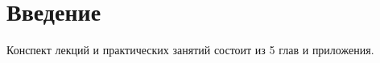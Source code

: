 \chapter*{Введение}
\chaptermark{}
Конспект лекций и практических занятий состоит из 5 глав и приложения.